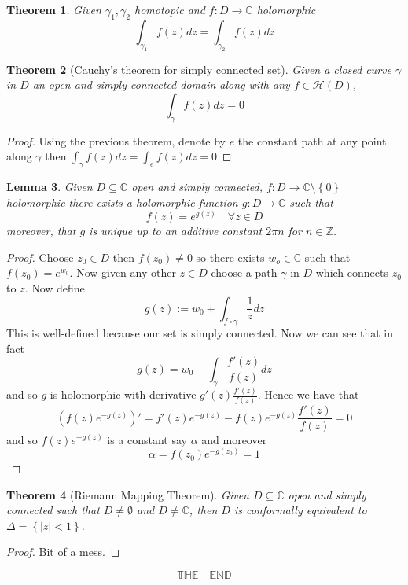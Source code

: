 \documentclass[11pt]{article}
\newcommand{\defeq}{:=}
\newcommand{\abs}[1]{\left|#1\right|}
\newcommand{\C}{\mathbb{C}}
\newcommand{\Z}{\mathbb{Z}}
\newtheorem{theorem}{Theorem}[section]
\newtheorem{lemma}[theorem]{Lemma}
\begin{document}
\begin{theorem}
Given $\gamma_1, \gamma_2$ homotopic and $f:D\to\C$ holomorphic
\[
	\int_{ \gamma_1 }f(z) dz = \int_{\gamma_2 }f(z)dz
\]
\end{theorem}

\begin{theorem}[Cauchy's theorem for simply connected set]
Given a closed curve $\gamma$ in $D$ an open and simply connected domain along with any $f\in\mathcal{H}(D)$,
\[
	\int_\gamma f(z)dz=0
\]
\end{theorem}

\begin{proof}
Using the previous theorem, denote by $e$ the constant path at any point along $\gamma$ then
$\int_\gamma f(z)dz = \int_e f(z)dz =0$
\end{proof}

\begin{lemma}
Given $D\subseteq \C$ open and simply connected, $f:D\to\C\setminus\left\{0\right\}$ holomorphic there exists a holomorphic function $g:D\to \C$ such that
\[
	f(z)=e^{g(z)}\quad\forall z\in D
\]
moreover, that $g$ is unique up to an additive constant $2\pi n$ for $n\in \Z$.
\end{lemma}

\begin{proof}
Choose $z_0\in D$ then $f(z_0)\neq 0$ so there exists $w_o\in\C$ such that $f(z_0)=e^{w_0}$.
Now given any other $z\in D$ choose a path $\gamma$ in $D$ which connects $z_0$ to $z$.
Now define
\[
	g(z)\defeq w_0+\int_{f\circ\gamma}\frac{1}{z}dz
\]
This is well-defined because our set is simply connected.
Now we can see that in fact
\[
	g(z)=w_0+\int_\gamma\frac{f'(z)}{f(z)}dz
\]
and so $g$ is holomorphic with derivative $g'(z)\frac{f'(z)}{f(z)}$.
Hence we have that
\[
	\left(f(z)e^{-g(z)}\right)'=f'(z)e^{-g(z)}-f(z)e^{-g(z)}\frac{f'(z)}{f(z)}=0
\]
and so $f(z)e^{-g(z)}$ is a constant say $\alpha$ and moreover
\[
	\alpha=f(z_0)e^{-g(z_0)}=1
\]
\end{proof}

\begin{theorem}[Riemann Mapping Theorem]
Given $D\subseteq \C$ open and simply connected such that $D\neq\emptyset$ and $D\neq\C$, then $D$ is conformally equivalent to $\Delta=\left\{\abs{z}<1\right\}$.
\end{theorem}
\begin{proof}
Bit of a mess.
\end{proof}

\[
	\mathbb{T}\mathbb{H}\mathbb{E}\quad\mathbb{E}\mathbb{N}\mathbb{D}
\]
\end{document}
